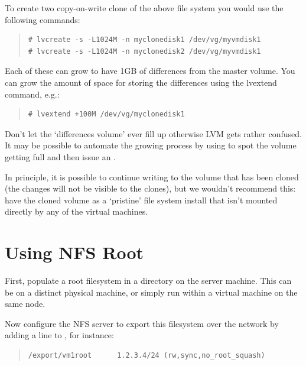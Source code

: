\documentclass[11pt,twoside,final,openright]{report}
\begin{document}
To create two copy-on-write clone of the above file system you
would use the following commands:

\begin{quote}
\begin{verbatim} 
# lvcreate -s -L1024M -n myclonedisk1 /dev/vg/myvmdisk1
# lvcreate -s -L1024M -n myclonedisk2 /dev/vg/myvmdisk1
\end{verbatim} 
\end{quote}

Each of these can grow to have 1GB of differences from the master
volume. You can grow the amount of space for storing the
differences using the lvextend command, e.g.:
\begin{quote}
\begin{verbatim} 
# lvextend +100M /dev/vg/myclonedisk1
\end{verbatim} 
\end{quote}

Don't let the `differences volume' ever fill up otherwise LVM gets
rather confused. It may be possible to automate the growing
process by using  to spot the volume getting full
and then issue an .

In principle, it is possible to continue writing to the volume
that has been cloned (the changes will not be visible to the
clones), but we wouldn't recommend this: have the cloned volume
as a `pristine' file system install that isn't mounted directly
by any of the virtual machines.


\section{Using NFS Root}

First, populate a root filesystem in a directory on the server
machine. This can be on a distinct physical machine, or simply 
run within a virtual machine on the same node.

Now configure the NFS server to export this filesystem over the
network by adding a line to , for instance:

\begin{quote}
\begin{small}
\begin{verbatim}
/export/vm1root      1.2.3.4/24 (rw,sync,no_root_squash)
\end{verbatim}
\end{small}
\end{quote}
\end{document}
